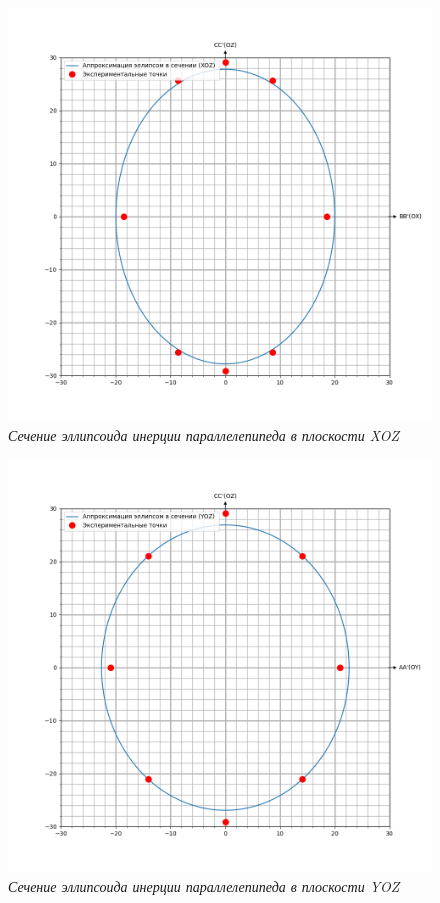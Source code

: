 \documentclass[a4paper,12pt]{article}
\begin{document}
\begin{figure}[h!]
    \includegraphics[width=1\textwidth]{xoz.png}
    \caption{\textit{Сечение эллипсоида инерции параллелепипеда в плоскости XOZ}}
    \label{xoz}
\end{figure}

\begin{figure}[h!]
    \includegraphics[width=1\textwidth]{yoz.png}
    \caption{\textit{Сечение эллипсоида инерции параллелепипеда в плоскости YOZ}}
    \label{yoz}
\end{figure}
\end{document}
